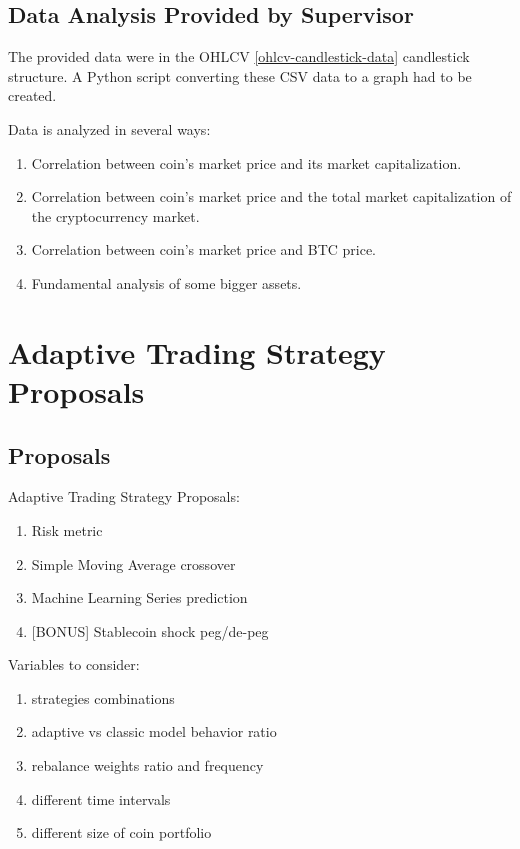 \section{Data Analysis Provided by Supervisor}

The provided data were in the OHLCV \ref{ohlcv-candlestick-data} candlestick structure. A Python script converting these CSV data to a graph had to be created.

Data is analyzed in several ways:
\begin{enumerate}
    \item Correlation between coin's market price and its market capitalization.
    \item Correlation between coin's market price and the total market capitalization of the cryptocurrency market.
    \item Correlation between coin's market price and BTC price.
    \item Fundamental analysis of some bigger assets.
\end{enumerate}

\chapter{Adaptive Trading Strategy Proposals}
\label{proposal}


\section{Proposals}

Adaptive Trading Strategy Proposals:
\begin{enumerate}
    \item Risk metric
    \item Simple Moving Average crossover
    \item Machine Learning Series prediction
    \item {[BONUS]} Stablecoin shock peg/de-peg
\end{enumerate}

Variables to consider:
\begin{enumerate}
    \item strategies combinations
    \item adaptive vs classic model behavior ratio
    \item rebalance weights ratio and frequency
    \item different time intervals
    \item different size of coin portfolio

\end{enumerate}

